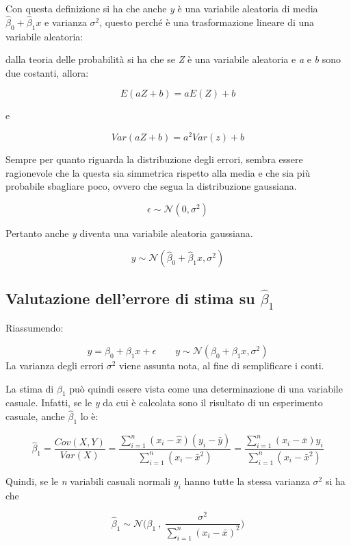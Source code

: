 Con questa definizione si ha che anche \emph{y} è una variabile aleatoria di media $\hat{\beta}_0 + \hat{\beta}_1x$ e varianza $\sigma^2$, questo
perché è una trasformazione lineare di una variabile aleatoria:

dalla teoria delle probabilità si ha che se \textit{Z} è una variabile aleatoria e \textit{a} e \textit{b} sono due costanti, allora:

$$
E(aZ+b) = aE(Z) + b
$$ 

e

$$
Var(aZ+b) = a^2Var(z)+b
$$

Sempre per quanto riguarda la distribuzione degli errori, sembra essere
ragionevole che la questa sia simmetrica rispetto alla media e che sia più probabile
sbagliare poco, ovvero che segua la distribuzione gaussiana.

$$
\epsilon \sim \mathcal{N}(0,\sigma^2)
$$

Pertanto anche \textit{y} diventa una variabile aleatoria gaussiana.

$$
y \sim \mathcal{N}(\hat{\beta}_0 + \hat{\beta}_1 x, \sigma^2)
$$



\subsection{Valutazione dell'errore di stima su $\hat{\beta}_1$}

Riassumendo:

$$
y = \beta_0 + \beta_1 x + \epsilon \qquad y \sim \mathcal{N}(\beta_0 + \beta_1 x, \sigma^2)
$$
La varianza degli errori $\sigma^2$ viene assunta nota, al fine di semplificare i conti.

La stima di $ \beta_1 $ può quindi essere vista come una determinazione di una variabile casuale. Infatti, se le \textit{y} da cui è calcolata sono il risultato di un esperimento casuale, anche $ \hat{\beta}_1 $ lo è:

$$
\hat{\beta}_1 = \frac{Cov(X,Y)}{Var(X)} = \frac{\sum\limits_{i=1}^n (x_i - \hat{x})(y_i - \bar{y})}{\sum\limits_{i=1}^n (x_i - \bar{x}^2)} = \frac{\sum\limits_{i=1}^n (x_i - \bar{x})y_i}{\sum\limits_{i=1}^n (x_i - \bar{x}^2)} 
$$

Quindi, se le \textit{n} variabili casuali normali $ y_i $ hanno tutte la stessa varianza $ \sigma^2 $ si ha che

$$
\hat{\beta}_1 \sim \mathcal{N}\Bigg(\beta_1 \: , \: \frac{\sigma^2}{\sum_{i=1}^n (x_i - \bar{x})^2}\Bigg)
$$

